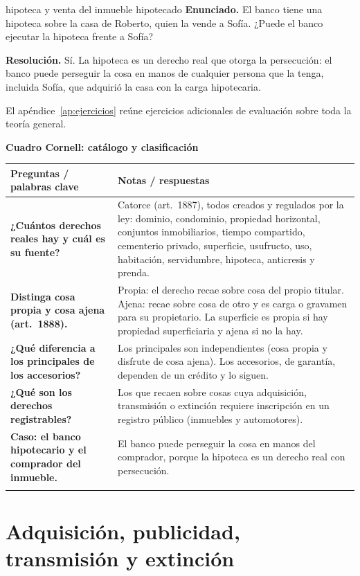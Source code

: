 \documentclass[12pt,oneside]{book}
\renewcommand{\arraystretch}{1.25}
\newcommand{\cq}[2]{\textbf{#1} & #2 \\[0.45em]}
\newcommand{\cornell}[3]{%
\par\bigskip\noindent\textbf{\large Cuadro Cornell: #1}\par\smallskip
\begin{center}
\small
\renewcommand{\arraystretch}{1.15}
\begin{tabularx}{\textwidth}{>{\raggedright\arraybackslash}p{0.27\textwidth}>{\raggedright\arraybackslash}X}
\toprule
\textbf{Preguntas / palabras clave} & \textbf{Notas / respuestas} \\
\midrule
#2
\midrule
\multicolumn{2}{p{\dimexpr\textwidth-2\tabcolsep\relax}}{\textbf{Resumen.} #3} \\
\bottomrule
\end{tabularx}
\end{center}
}
\begin{document}
\begin{ejercicio}{hipoteca y venta del inmueble hipotecado}
\textbf{Enunciado.} El banco tiene una hipoteca sobre la casa de Roberto, quien la vende a Sofía. ¿Puede el banco ejecutar la hipoteca frente a Sofía?

\textbf{Resolución.} Sí. La hipoteca es un derecho real que otorga la persecución: el banco puede perseguir la cosa en manos de cualquier persona que la tenga, incluida Sofía, que adquirió la casa con la carga hipotecaria.
\end{ejercicio}

El apéndice~\ref{ap:ejercicios} reúne ejercicios adicionales de evaluación sobre toda la teoría general.

\cornell{catálogo y clasificación}{
\cq{¿Cuántos derechos reales hay y cuál es su fuente?}{Catorce (art.~1887), todos creados y regulados por la ley: dominio, condominio, propiedad horizontal, conjuntos inmobiliarios, tiempo compartido, cementerio privado, superficie, usufructo, uso, habitación, servidumbre, hipoteca, anticresis y prenda.}
\cq{Distinga cosa propia y cosa ajena (art.~1888).}{Propia: el derecho recae sobre cosa del propio titular. Ajena: recae sobre cosa de otro y es carga o gravamen para su propietario. La superficie es propia si hay propiedad superficiaria y ajena si no la hay.}
\cq{¿Qué diferencia a los principales de los accesorios?}{Los principales son independientes (cosa propia y disfrute de cosa ajena). Los accesorios, de garantía, dependen de un crédito y lo siguen.}
\cq{¿Qué son los derechos registrables?}{Los que recaen sobre cosas cuya adquisición, transmisión o extinción requiere inscripción en un registro público (inmuebles y automotores).}
\cq{Caso: el banco hipotecario y el comprador del inmueble.}{El banco puede perseguir la cosa en manos del comprador, porque la hipoteca es un derecho real con persecución.}
}{El art.~1887 fija una lista cerrada de catorce derechos reales y el art.~1888 los clasifica según recaigan sobre cosa propia o ajena, sean principales o accesorios, registrables o no registrables, y se ejerzan o no por posesión.}

\part{Adquisición, publicidad, transmisión y extinción}

\end{document}
